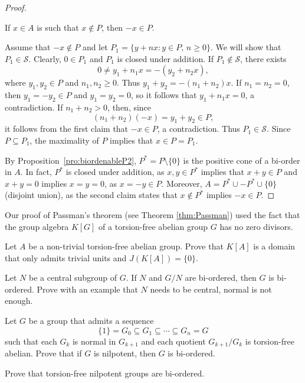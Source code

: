 \begin{graybox}
\begin{proof}
	\begin{claim}
		If $x\in A$ is such that $x\not\in P$, then $-x\in P$. 	
	\end{claim}

	Assume that $-x\not\in P$ and let $P_1=\{y+nx:y\in P,\,n\geq0\}$. We will
	show that  $P_1\in\mathcal{S}$.  Clearly, $0\in P_1$ and $P_1$ is closed under
	addition. If $P_1\not\in\mathcal{S}$, there exists 
	\[
		0\ne y_1+n_1x=-(y_2+n_2x),
	\]
	where $y_1,y_2\in P$ and $n_1,n_2\geq0$. Thus $y_1+y_2=-(n_1+n_2)x$. If 
	$n_1=n_2=0$, then $y_1=-y_2\in P$ and $y_1=y_2=0$, so it follows that
	$y_1+n_1x=0$, a contradiction. If $n_1+n_2>0$, then, since 
	\[
		(n_1+n_2)(-x)=y_1+y_2\in P,
	\]
	it follows from the first claim that $-x\in P$, a contradiction. 
	Thus $P_1\in\mathcal{S}$. 
	Since $P\subseteq P_1$, the maximality of $P$ implies that 
	$x\in P=P_1$.

	\medskip
	By Proposition~\ref{pro:biordenableP2}, 
	$P^*=P\setminus\{0\}$ is the positive cone of a bi-order in $A$. 
	In fact, $P^*$ is closed under addition, as $x,y\in
	P^*$ implies that $x+y\in P$ and $x+y=0$ implies $x=y=0$, as $x=-y\in P$. Moreover,
	$A=P^*\cup -P^*\cup\{0\}$ (disjoint union), as 
	the second claim states that $x\not\in P^*$ implies 
	$-x\in P$. 
\end{proof}

Our proof of Passman's theorem (see Theorem \ref{thm:Passman}) 
used the fact that the group algebra $K[G]$ of
a torsion-free abelian group $G$ has no zero divisors. 

\begin{xca}
\label{xca:domain_G_abelian}
	Let $A$ be a non-trivial torsion-free abelian group. Prove that $K[A]$ 
	is a domain that only admits trivial units and $J(K[A])=\{0\}$. 
\end{xca}



\begin{xca}
    Let $N$ be a central subgroup of $G$. If $N$ and $G/N$ are bi-ordered, 
    then $G$ is bi-ordered. Prove with an example that $N$ needs to be central, normal 
    is not enough. 
\end{xca}

\begin{xca}
    Let $G$ be a group that admits 
    a sequence 
    \[
    \{1\}=G_0\subseteq G_1\subseteq\cdots\subseteq G_n=G
    \]
    such that
    each $G_k$ is normal in $G_{k+1}$ and each quotient $G_{k+1}/G_k$ is 
    torsion-free abelian. Prove that if $G$ is nilpotent, then $G$ is bi-ordered.  
\end{xca}

\begin{xca}
    Prove that torsion-free nilpotent groups are bi-ordered. 
\end{xca}
\end{graybox}

